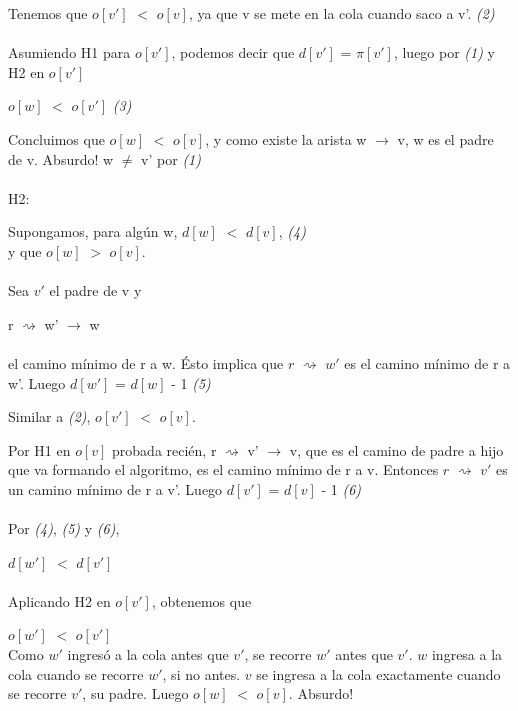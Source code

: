 \documentclass[11pt, a4paper, twoside]{article}
\begin{document}
Tenemos que $o[v']$ $<$ $o[v]$, ya que v se mete en la cola cuando saco a v'. \hfill\emph{(2)}
\\\\Asumiendo H1 para $o[v']$, podemos decir que $d[v']$ = $\pi[v']$, luego por \emph{(1)} y H2 en $o[v']$

$o[w]$ $<$ $o[v']$ \hfill\emph{(3)}	

Concluimos que $o[w]$ $<$ $o[v]$, y como existe la arista w $\rightarrow$ v, w es el padre de v. Absurdo! w $\neq$ v' por \emph{(1)}
\\\\H2:

Supongamos, para algún w, $d[w]$ $<$ $d[v]$, \hfill\emph{(4)}
\\y que $o[w]$ $>$ $o[v]$.
\\\\Sea $v'$ el padre de v y 

r $\rightsquigarrow$ w' $\rightarrow$ w
\\\\el camino mínimo de r a w. Ésto implica que $r$ $\rightsquigarrow$ $w'$ es el camino mínimo de r a w'. Luego $d[w']$ = $d[w]$ - 1 \hfill\emph{(5)}

Similar a \emph{(2)}, $o[v']$ $<$ $o[v]$.

Por H1 en $o[v]$ probada recién, r $\rightsquigarrow$ v' $\rightarrow$ v, que es el camino de padre a hijo que va formando el algoritmo, es el camino mínimo de r a v. Entonces $r$ $\rightsquigarrow$ $v'$ es un camino mínimo de r a v'. Luego $d[v']$ = $d[v]$ - 1 \hfill\emph{(6)}
\\\\Por \emph{(4)}, \emph{(5)} y \emph{(6)},

$d[w']$ $<$ $d[v']$
\\\\Aplicando H2 en $o[v']$, obtenemos que

$o[w']$ $<$ $o[v']$
\\Como $w'$ ingresó a la cola antes que $v'$, se recorre $w'$ antes que $v'$. $w$ ingresa a la cola cuando se recorre $w'$, si no antes. $v$ se ingresa a la cola exactamente cuando se recorre $v'$, su padre. Luego $o[w]$ $<$ $o[v]$. Absurdo!
\end{document}

